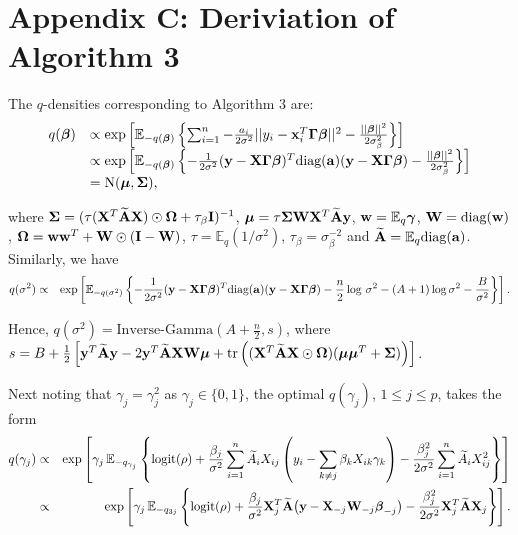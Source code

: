 \documentclass[11pt]{article}
\newtheorem{Main Result}{Main Result}
\def\vectorfontone{\bf}
\def\vectorfonttwo{\boldsymbol}
\def\va{{\vectorfontone a}}                      %
\def\vw{{\vectorfontone w}}                      %
\def\vx{{\vectorfontone x}}                      %
\def\vy{{\vectorfontone y}}                      %
\def\vbeta{{\vectorfonttwo \beta}}               %
\def\vgamma{{\vectorfonttwo \gamma}}             %
\def\vmu{{\vectorfonttwo \mu}}                   %
\def\matrixfontone{\bf}
\def\matrixfonttwo{\boldsymbol}
\def\mA{{\matrixfontone A}}                      %
\def\mI{{\matrixfontone I}}                      %
\def\mW{{\matrixfontone W}}                      %
\def\mX{{\matrixfontone X}}                      %
\def\mGamma{{\matrixfonttwo \Gamma}}             %
\def\mSigma{{\matrixfonttwo \Sigma}}             %
\def\mOmega{{\matrixfonttwo \Omega}}             %
\def\bE{{\mathbb E}}                             %
\def\tr{\text{tr}}
\newcommand{\cyc}[1]{{\color{black}#1}}
\newcommand{\joc}[1]{{\color{black}#1}}
\begin{document}
\joc{ 

\section*{Appendix C: Deriviation of Algorithm 3}

\noindent The $q$-densities corresponding to Algorithm 3 are:
$$
\begin{array}{ll}
q(\vbeta)
&\propto\exp\left[\bE_{-q(\vbeta)}
\left\{ \sum_{i=1}^n-\frac{a_i}{2\sigma^2}||y_i-\vx_i^T\mGamma\vbeta||^2
-\frac{||\vbeta||^2}{2\sigma^2_\beta}\right\}\right]\\
&\propto\exp\left[\bE_{-q(\vbeta)}
\left\{ -\frac{1}{2\sigma^2}(\vy-\mX\mGamma\vbeta)^T\mbox{diag}(\va)(\vy-\mX\mGamma\vbeta)
-\frac{||\vbeta||^2}{2\sigma^2_\beta}\right\}\right]\\
&=\mbox{N}(\vmu,\mSigma),
\end{array}
$$

\noindent where $\mSigma=(\tau (\mX^T\widetilde{\mA}\mX)\odot\mOmega + \tau_\beta\mI)^{-1}$, $\vmu=\tau\mSigma\mW\mX^T\widetilde{\mA}\vy$, $\vw=\bE_q\vgamma$, $\mW=\mbox{diag}(\vw)$, $\mOmega = \vw\vw^{T} + \mW\odot(\mI - \mW)$, $\tau=\bE_q(1/\sigma^2)$, $\tau_\beta=\sigma^{-2}_\beta$ and $\widetilde{\mA}=\bE_q\mbox{diag}(\va)$. Similarly, we have
\begin{eqnarray*}
	q(\sigma^2)
	&\propto&\exp\left[\bE_{-q(\sigma^2)}\left\{
	-\frac{1}{2\sigma^2}(\vy-\mX\mGamma\vbeta)^T\mbox{diag}(\va)(\vy-\mX\mGamma\vbeta)-\frac{n}{2}\log\,\sigma^2-(A+1)\log\sigma^2
	-\frac{B}{\sigma^2}\right\}\right].
\end{eqnarray*}

\noindent Hence,
$q(\sigma^2) = \mbox{Inverse-Gamma}(A+\tfrac{n}{2},s)$, where
$s = B + \frac{1}{2}\left[
\cyc{\vy^T\widetilde{\mA}\vy} - 2\vy^T\widetilde{\mA}\mX\mW\vmu
+\tr\left( (\mX^T\widetilde{\mA}\mX\odot\mOmega)(\vmu\vmu^T + \mSigma) \right)\right]
$.

\noindent Next noting that $\gamma_j=\gamma_j^2$ as $\gamma_j\in\{0,1\}$, the optimal $q(\gamma_j)$, $1\le j\le p$, takes the form
\begin{eqnarray*}
	q(\gamma_j)
	&\propto&\exp\left[\gamma_j\,\bE_{-q_{\gamma_j}}\left\{\mbox{logit}(\rho)
	+\frac{\beta_j}{\sigma^2}\sum_{i=1}^n \widetilde{A}_i X_{ij}\left(y_i-\sum_{k\neq j}\beta_k X_{ik}\gamma_k\right)-\frac{\beta_j^2}{2\sigma^2}\sum_{i=1}^n\widetilde{A}_i X_{ij}^2\right\}\right]\\
	&\propto&\exp\left[\gamma_j\,\bE_{-q_{3j}}\left\{\mbox{logit}(\rho)
	+\frac{\beta_j}{\sigma^2}\mX_j^T\widetilde{\mA}\big(\vy-\mX_{-j}\mW_{-j}\vbeta_{-j}\big)
	-\frac{\beta_j^2}{2\sigma^2}\mX_j^T\widetilde{\mA}\mX_j\right\}\right].
\end{eqnarray*}

}
\end{document}
